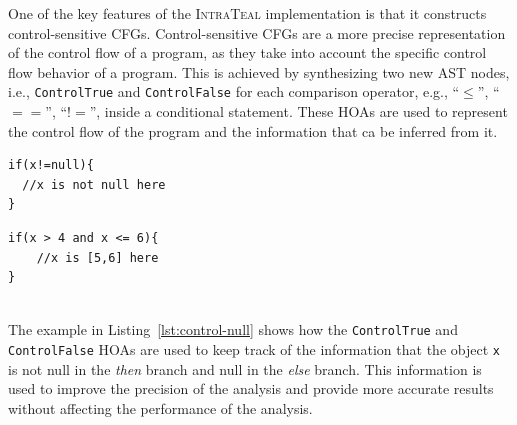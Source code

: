 One of the key features of the \textsc{IntraTeal} implementation is that it 
constructs control-sensitive CFGs. Control-sensitive CFGs
are a more precise representation of the control flow of a program, as they take 
into account the specific control flow behavior of a program. This is achieved by
synthesizing  two new AST nodes, i.e., \texttt{ControlTrue} and \texttt{ControlFalse} for each
comparison operator, e.g.,  ``$\le$'', ``$==$'', ``$!=$'', inside a conditional statement.
These HOAs are used to represent the control flow of the program and the information that ca be inferred from 
it. \\
%
\begin{minipage}{0.45\textwidth}
    \begin{lstlisting}[language=JastAdd,caption={Control-sensitivity to improve null pointer analysis.}, label={lst:control-null}]
if(x!=null){
  //x is not null here
}
    \end{lstlisting}
    \end{minipage}\hfill%
    \begin{minipage}{0.45\textwidth}
    \begin{lstlisting}[language=JastAdd,caption={Control-sensitivity to improve interval analysis.}, label={lst:control-interval}]
if(x > 4 and x <= 6){
    //x is [5,6] here
}
    \end{lstlisting}
\end{minipage}\\
The example in Listing~\ref{lst:control-null} shows how the \texttt{ControlTrue} and \texttt{ControlFalse}
HOAs are used to keep track of the information that the object \texttt{x} is not null 
in the \emph{then} branch and null in the \emph{else} branch.
This information is used to improve the precision of the analysis and provide 
more accurate results without affecting the performance of the analysis.

